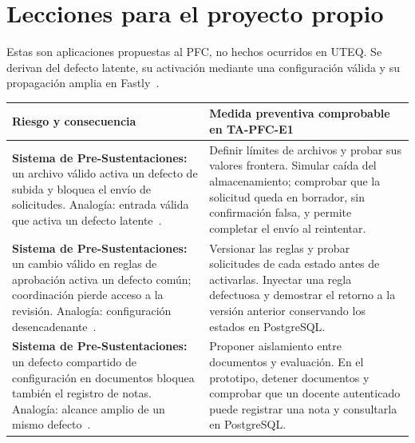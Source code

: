 \clearpage
\section*{Lecciones para el proyecto propio}
Estas son aplicaciones propuestas al PFC, no hechos ocurridos en UTEQ. Se derivan del defecto latente, su activación mediante una configuración válida y su propagación amplia en Fastly~\cite{fastly2021}.

\begingroup
\small
\renewcommand{\arraystretch}{1.15}
\begin{tabularx}{\linewidth}{@{}YY@{}}
\toprule
Riesgo y consecuencia & Medida preventiva comprobable en TA-PFC-E1 \\
\midrule
\textbf{Sistema de Pre-Sustentaciones:} un archivo válido activa un defecto de subida y bloquea el envío de solicitudes. Analogía: entrada válida que activa un defecto latente~\cite{fastly2021}.
& Definir límites de archivos y probar sus valores frontera. Simular caída del almacenamiento; comprobar que la solicitud queda en borrador, sin confirmación falsa, y permite completar el envío al reintentar. \\
\addlinespace
\textbf{Sistema de Pre-Sustentaciones:} un cambio válido en reglas de aprobación activa un defecto común; coordinación pierde acceso a la revisión. Analogía: configuración desencadenante~\cite{fastly2021}.
& Versionar las reglas y probar solicitudes de cada estado antes de activarlas. Inyectar una regla defectuosa y demostrar el retorno a la versión anterior conservando los estados en PostgreSQL. \\
\addlinespace
\textbf{Sistema de Pre-Sustentaciones:} un defecto compartido de configuración en documentos bloquea también el registro de notas. Analogía: alcance amplio de un mismo defecto~\cite{fastly2021}.
& Proponer aislamiento entre documentos y evaluación. En el prototipo, detener documentos y comprobar que un docente autenticado puede registrar una nota y consultarla en PostgreSQL. \\
\bottomrule
\end{tabularx}
\endgroup
